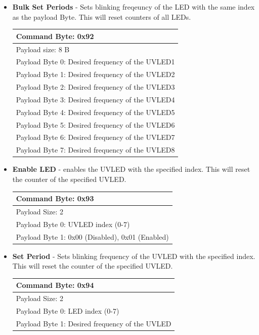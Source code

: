 \documentclass[12pt, a4paper]{article}
\begin{document}
\begin{itemize}
\item \textbf{Bulk Set Periods} - Sets blinking freqeuncy of the LED with the same index as the payload Byte. This will reset counters of all LEDs.\\
\begin{flushleft}
\begin{tabular}{|l|}
\hline
Command Byte: 0x92													\\ \hline
Payload size: 8 B													\\ \hline
Payload Byte 0: Desired frequency of the UVLED1						\\ \hline
Payload Byte 1: Desired frequency of the UVLED2						\\ \hline
Payload Byte 2: Desired frequency of the UVLED3						\\ \hline
Payload Byte 3: Desired frequency of the UVLED4						\\ \hline
Payload Byte 4: Desired frequency of the UVLED5						\\ \hline
Payload Byte 5: Desired frequency of the UVLED6						\\ \hline
Payload Byte 6: Desired frequency of the UVLED7						\\ \hline
Payload Byte 7: Desired frequency of the UVLED8						\\ \hline
\end{tabular}
\end{flushleft}

\item \textbf{Enable LED} - enables the UVLED with the specified index. This will reset the counter of the specified UVLED.\\
\begin{flushleft}
\begin{tabular}{|l|}
\hline
Command Byte: 0x93													\\ \hline
Payload Size: 2														\\ \hline
Payload Byte 0: UVLED index (0-7)									\\ \hline
Payload Byte 1: 0x00 (Disabled), 0x01 (Enabled)						\\ \hline
\end{tabular}
\end{flushleft}

\item \textbf{Set Period} - Sets blinking frequency of the UVLED with the specified index. This will reset the counter of the specified UVLED.\\
\begin{flushleft}
\begin{tabular}{|l|}
\hline
Command Byte: 0x94													\\ \hline
Payload Size: 2														\\ \hline
Payload Byte 0: LED index (0-7)										\\ \hline
Payload Byte 1: Desired frequency of the UVLED						\\ \hline
\end{tabular}
\end{flushleft}


\end{itemize}
\end{document}
